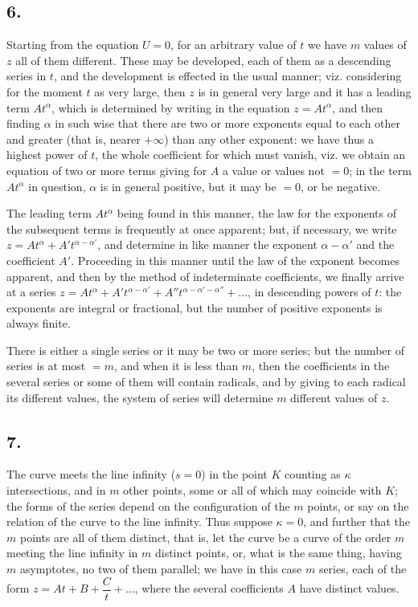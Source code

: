 \documentclass[11pt,a4paper]{article}
\theoremstyle{definition}
\begin{document}
\subsection*{6.}

Starting from the equation $U = 0$, for an arbitrary value of $t$ we have $m$ values of $z$ all of them different. These may be developed, each of them as a descending series in $t$, and the development is effected in the usual manner; viz. considering for the moment $t$ as very large, then $z$ is in general very large and it has a leading term $At^\alpha$, which is determined by writing in the equation $z = At^\alpha$, and then finding $\alpha$ in such wise that there are two or more exponents equal to each other and greater (that is, nearer $+\infty$) than any other exponent: we have thus a highest power of $t$, the whole coefficient for which must vanish, viz. we obtain an equation of two or more terms giving for $A$ a value or values not $= 0$; in the term $At^\alpha$ in question, $\alpha$ is in general positive, but it may be $= 0$, or be negative.

The leading term $At^\alpha$ being found in this manner, the law for the exponents of the subsequent terms is frequently at once apparent; but, if necessary, we write $z = At^\alpha + A' t^{\alpha - \alpha'}$, and determine in like manner the exponent $\alpha - \alpha'$ and the coefficient $A'$. Proceeding in this manner until the law of the exponent becomes apparent, and then by the method of indeterminate coefficients, we finally arrive at a series $z = At^\alpha + A' t^{\alpha - \alpha'} + A'' t^{\alpha - \alpha' - \alpha''} + \ldots$, in descending powers of $t$: the exponents are integral or fractional, but the number of positive exponents is always finite.

There is either a single series or it may be two or more series; but the number of series is at most $= m$, and when it is less than $m$, then the coefficients in the several series or some of them will contain radicals, and by giving to each radical its different values, the system of series will determine $m$ different values of $z$.

\subsection*{7.}

The curve meets the line infinity ($s = 0$) in the point $K$ counting as $\kappa$ intersections, and in $m$ other points, some or all of which may coincide with $K$; the forms of the series depend on the configuration of the $m$ points, or say on the relation of the curve to the line infinity. Thus suppose $\kappa = 0$, and further that the $m$ points are all of them distinct, that is, let the curve be a curve of the order $m$ meeting the line infinity in $m$ distinct points, or, what is the same thing, having $m$ asymptotes, no two of them parallel; we have in this case $m$ series, each of the form $z = At + B + \dfrac{C}{t} + \ldots$, where the several coefficients $A$ have distinct values.
\end{document}
